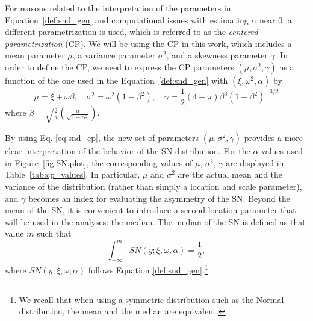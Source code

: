 \documentclass[11pt, oneside]{article}
\begin{document}
For reasons related to the interpretation of the parameters in Equation~\eqref{def:snd_gen} and computational issues with estimating $\alpha$ near 0, a different parametrization is used, which is referred to as the \emph{centered parametrization} (CP).  We will be using the CP in this work, which includes a mean parameter $\mu$, a variance parameter $\sigma^2$, and a skewness parameter $\gamma$.  In order to define the CP, we need to express the CP parameters $(\mu, \sigma^2, \gamma)$ as a function of the one used in the Equation~\eqref{def:snd_gen} with $(\xi, \omega^2, \alpha)$ by
%
\begin{equation} \label{eq:snd_cp}
\mu = \xi + \omega \beta, \quad \sigma^{2} = \omega^{2}(1-\beta^2), \quad \gamma = \frac{1}{2}(4-\pi) \beta^{3}\left(1-\beta^2\right)^{-3/2}
\end{equation}
where $\beta = \sqrt{\frac{2}{\pi}}\left(\frac{\alpha}{\sqrt{1+\alpha^2}}\right)$.

By using Eq. \ref{eq:snd_cp}, the new set of parameters $(\mu, \sigma^2, \gamma)$ provides a more clear interpretation of the behavior of the SN distribution. For the $\alpha$ values used in Figure~\ref{fig:SN.plot}, the corresponding values of $\mu$, $\sigma^2$, $\gamma$ are displayed in Table~\ref{tab:cp_values}.  In particular, $\mu$ and $\sigma^2$ are the actual mean and the variance of the distribution (rather than simply a location and scale parameter), and $\gamma$ becomes an index for evaluating the asymmetry of the SN. Beyond the mean of the SN, it is convenient to introduce a second location parameter that will be used in the analyses: the median. The median of the SN is defined as that value $m$ such that 
%
\begin{equation} \label{eq:snmed}
\int_{-\infty}^{m} SN(y;\xi, \omega, \alpha) = \frac{1}{2},
\end{equation}
%
where $SN(y;\xi, \omega, \alpha)$ follows Equation \ref{def:snd_gen}.\footnote{We recall that when using a symmetric distribution such as the Normal distribution, the mean and the median are equivalent.}
\end{document}
